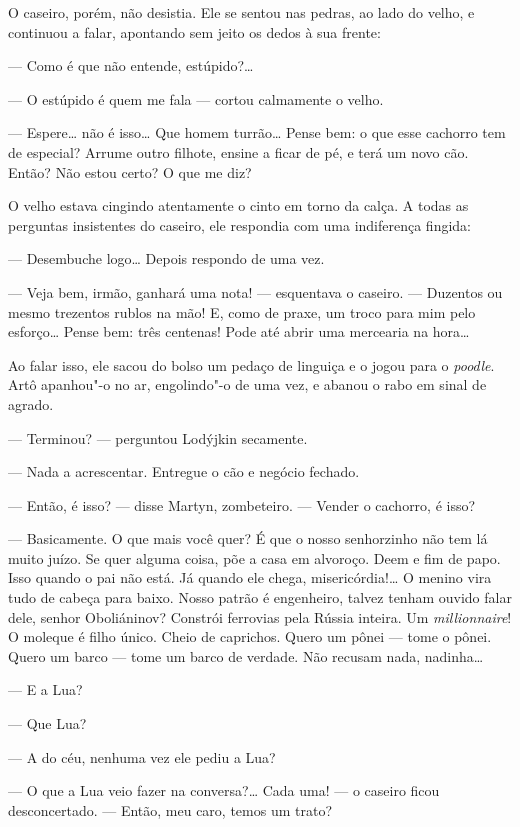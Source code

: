 O caseiro, porém, não desistia. Ele se sentou nas pedras, ao lado do
velho, e continuou a falar, apontando sem jeito os dedos à sua frente:

--- Como é que não entende, estúpido?\ldots{}

--- O estúpido é quem me fala --- cortou calmamente o velho.

--- Espere\ldots{} não é isso\ldots{} Que homem turrão\ldots{} Pense bem: o que esse
cachorro tem de especial? Arrume outro filhote, ensine a ficar de pé, e
terá um novo cão. Então? Não estou certo? O que me diz?

O velho estava cingindo atentamente o cinto em torno da calça. A todas
as perguntas insistentes do caseiro, ele respondia com uma indiferença
fingida:

--- Desembuche logo\ldots{} Depois respondo de uma vez.

--- Veja bem, irmão, ganhará uma nota! --- esquentava o caseiro. ---
Duzentos ou mesmo trezentos rublos na mão! E, como de praxe, um troco
para mim pelo esforço\ldots{} Pense bem: três centenas! Pode até abrir uma
mercearia na hora\ldots{}

Ao falar isso, ele sacou do bolso um pedaço de linguiça e o jogou para o
\emph{poodle}. Artô apanhou"-o no ar, engolindo"-o de uma vez, e abanou o
rabo em sinal de agrado.

--- Terminou? --- perguntou Lodýjkin secamente.

--- Nada a acrescentar. Entregue o cão e negócio fechado.

--- Então, é isso? --- disse Martyn, zombeteiro. --- Vender o cachorro,
é isso?

--- Basicamente. O que mais você quer? É que o nosso senhorzinho não tem
lá muito juízo. Se quer alguma coisa, põe a casa em alvoroço. Deem e fim
de papo. Isso quando o pai não está. Já quando ele chega,
misericórdia!\ldots{} O menino vira tudo de cabeça para baixo. Nosso patrão é
engenheiro, talvez tenham ouvido falar dele, senhor Oboliáninov?
Constrói ferrovias pela Rússia inteira. Um \emph{millionnaire}! O moleque
é filho único. Cheio de caprichos. Quero um pônei --- tome o pônei.
Quero um barco --- tome um barco de verdade. Não recusam nada,
nadinha\ldots{}

--- E a Lua?

--- Que Lua?

--- A do céu, nenhuma vez ele pediu a Lua?

--- O que a Lua veio fazer na conversa?\ldots{} Cada uma! --- o caseiro ficou
desconcertado. --- Então, meu caro, temos um trato?

